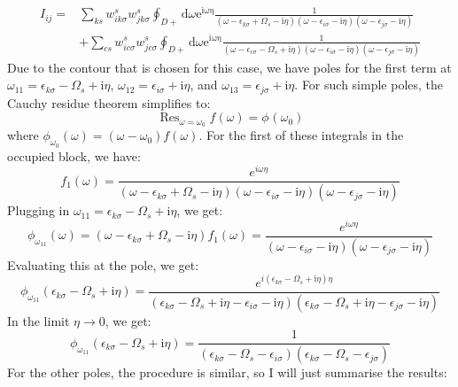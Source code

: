 \documentclass[12pt]{article}
\begin{document}
\begin{equation}
\begin{aligned}
I_{ij} =& \sum_{ks} w_{i k \sigma}^s w_{j k \sigma}^s \oint_{D+} \mathrm{d} \omega \mathrm{e}^{\mathrm{i \omega \eta}} \frac{1}{(\omega-\epsilon_{k \sigma}+\Omega_s-\mathrm{i} \eta)(\omega-\epsilon_{i \sigma}-\mathrm{i} \eta)(\omega-\epsilon_{j \sigma}-\mathrm{i} \eta)}\\
& + \sum_{cs} w_{i c \sigma}^s w_{j c \sigma}^s \oint_{D+} \mathrm{d} \omega \mathrm{e}^{\mathrm{i \omega \eta}} \frac{1}{(\omega-\epsilon_{c \sigma}-\Omega_s+\mathrm{i} \eta)(\omega-\epsilon_{i \sigma}-\mathrm{i} \eta)(\omega-\epsilon_{j \sigma}-\mathrm{i} \eta)}
\end{aligned}
\end{equation}
Due to the contour that is chosen for this case, we have poles for the first term at $\omega_{11} = \epsilon _{k\sigma } - \Omega _s + \mathrm{i} \eta$, $\omega_{12} = \epsilon _{i\sigma } + \mathrm{i} \eta$, and $\omega_{13} = \epsilon _{j\sigma } + \mathrm{i} \eta$. For such simple poles, the Cauchy residue theorem simplifies to:
\begin{equation}
\operatorname{Res}_{\omega =\omega _0} f(\omega )= \phi^{}\left(\omega _0\right)
\label{eqn:cauchy_residue}
\end{equation}
where $\phi_{\omega _0}(\omega ) = (\omega - \omega_0) f(\omega )$. For the first of these integrals in the occupied block, we have:
\begin{equation}
f_1(\omega) = \frac{e^{i\omega \eta }}{(\omega-\epsilon_{k \sigma}+\Omega_s-\mathrm{i} \eta)(\omega-\epsilon_{i \sigma}-\mathrm{i} \eta)(\omega-\epsilon_{j \sigma}-\mathrm{i} \eta)}
\end{equation}
Plugging in $\omega_{11} = \epsilon _{k\sigma } - \Omega _s + \mathrm{i} \eta$, we get:
\begin{equation}
\phi_{\omega_{11}}(\omega) = (\omega - \epsilon_{k \sigma} + \Omega_s - \mathrm{i} \eta) f_1(\omega) = \frac{e^{i\omega \eta }}{(\omega-\epsilon_{i \sigma}-\mathrm{i} \eta)(\omega-\epsilon_{j \sigma}-\mathrm{i} \eta)}
\end{equation}
Evaluating this at the pole, we get:
\begin{equation}
\phi_{\omega_{11}}(\epsilon_{k \sigma} - \Omega_s + \mathrm{i} \eta) = \frac{e^{i(\epsilon_{k \sigma} - \Omega_s + \mathrm{i} \eta) \eta }}{(\epsilon_{k \sigma} - \Omega_s + \mathrm{i} \eta-\epsilon_{i \sigma}-\mathrm{i} \eta)(\epsilon_{k \sigma} - \Omega_s + \mathrm{i} \eta-\epsilon_{j \sigma}-\mathrm{i} \eta)}
\end{equation}
In the limit $\eta \to 0$, we get:
\begin{equation}
\boxed{\phi_{\omega_{11}}(\epsilon_{k \sigma} - \Omega_s + \mathrm{i} \eta) = \frac{1}{(\epsilon_{k \sigma} - \Omega_s -\epsilon_{i \sigma})(\epsilon_{k \sigma} - \Omega_s -\epsilon_{j \sigma})}}
\end{equation}
For the other poles, the procedure is similar, so I will just summarise the results:
\end{document}

